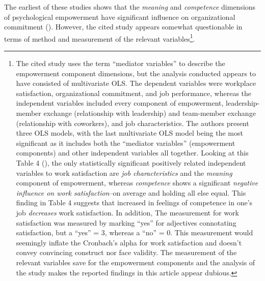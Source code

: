 \documentclass[
  11pt,
  a4paper,
]{article}
\begin{document}
The earliest of these studies shows that the \emph{meaning} and
\emph{competence} dimensions of psychological empowerment have
significant influence on organizational commitment
(). However,
the cited study appears somewhat questionable in terms of method and
measurement of the relevant variables\footnote{The cited study uses the
  term ``mediator variables'' to describe the empowerment component
  dimensions, but the analysis conducted appears to have consisted of
  multivariate OLS. The dependent variables were workplace satisfaction,
  organizational commitment, and job performance, whereas the
  independent variables included every component of empowerment,
  leadership-member exchange (relationship with leadership) and
  team-member exchange (relationship with coworkers), and job
  characteristics. The authors present three OLS models, with the last
  multivariate OLS model being the most significant as it includes both
  the ``mediator variables'' (empowerment components) and other
  independent variables all together. Looking at this Table 4
  (), the
  only statistically significant positively related independent
  variables to work satisfaction are \emph{job characteristics} and the
  \emph{meaning} component of empowerment, whereas \emph{competence}
  shows a significant \emph{negative influence on work satisfaction}--on
  average and holding all else equal. This finding in Table 4 suggests
  that increased in feelings of competence in one's job \emph{decreases}
  work satisfaction. In addition, The measurement for work satisfaction
  was measured by marking ``yes'' for adjectives connotating
  satisfaction, but a ``yes'' = 3, whereas a ``no'' = 0. This
  measurement would seemingly inflate the Cronbach's alpha for work
  satisfaction and doesn't convey convincing construct nor face
  validity. The measurement of the relevant variables save for the
  empowerment components and the analysis of the study makes the
  reported findings in this article appear dubious.}.
\end{document}
